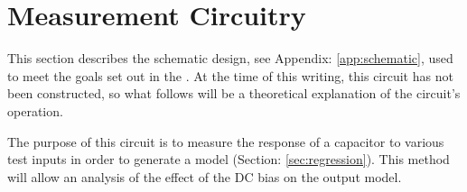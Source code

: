 \section {Measurement Circuitry}
\label{sec:measCirc}
This section describes the schematic design, see Appendix: \ref{app:schematic}, used to meet the goals set out in the . At the time of this writing, this circuit has not been constructed, so what follows will be a theoretical explanation of the circuit's operation.

The purpose of this circuit is to measure the response of a capacitor to various test inputs in order to generate a model (Section: \ref{sec:regression}). This method will allow an analysis of the effect of the DC bias on the output model.

\nocite{my_ieeePaper}













